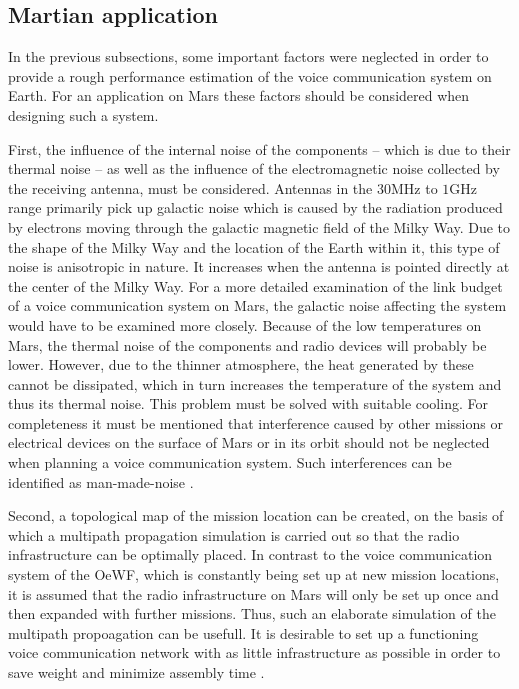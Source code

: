 \subsection{Martian application}
In the previous subsections, some important factors were neglected in order to provide a rough performance estimation of the voice communication system on Earth. For an application on Mars these factors should be considered when designing such a system. 

First, the influence of the internal noise of the components -- which is due to their thermal noise -- as well as the influence of the electromagnetic noise collected by the receiving antenna, must be considered. Antennas in the $30\mathrm{MHz}$ to $1\mathrm{GHz}$ range primarily pick up galactic noise which is caused by the radiation produced by electrons moving through the galactic magnetic field of the Milky Way. Due to the shape of the Milky Way and the location of the Earth within it, this type of noise is anisotropic in nature. It increases when the antenna is pointed directly at the center of the Milky Way. For a more detailed examination of the link budget of a voice communication system on Mars, the galactic noise affecting the system would have to be examined more closely. Because of the low temperatures on Mars, the thermal noise of the components and radio devices will probably be lower. However, due to the thinner atmosphere, the heat generated by these cannot be dissipated, which in turn increases the temperature of the system and thus its thermal noise. This problem must be solved with suitable cooling. For completeness it must be mentioned that interference caused by other missions or electrical devices on the surface of Mars or in its orbit should not be neglected when planning a voice communication system. Such interferences can be identified as man-made-noise \cite{Glover:2010, Goiser:2019, Kemmetmuller:2021}. 

Second, a topological map of the mission location can be created, on the basis of which a multipath propagation simulation is carried out so that the radio infrastructure can be optimally placed. In contrast to the voice communication system of the OeWF, which is constantly being set up at new mission locations, it is assumed that the radio infrastructure on Mars will only be set up once and then expanded with further missions. Thus, such an elaborate simulation of the multipath propoagation can be usefull. It is desirable to set up a functioning voice communication network with as little infrastructure as possible in order to save weight and minimize assembly time \cite{Ho:2002}.

